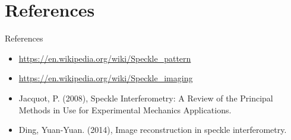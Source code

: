 \documentclass[pdf]{beamer}
\begin{document}
\section{References}
\begin{frame}{References}
\begin{itemize}
\item{\url{https://en.wikipedia.org/wiki/Speckle_pattern}}
\item{\url{https://en.wikipedia.org/wiki/Speckle_imaging}}
\item{Jacquot, P. (2008), Speckle Interferometry: A Review of the Principal Methods in Use for Experimental Mechanics Applications.}
\item{Ding, Yuan-Yuan. (2014), Image reconstruction in speckle interferometry.}
\end{itemize}
\end{frame}
\end{document}
